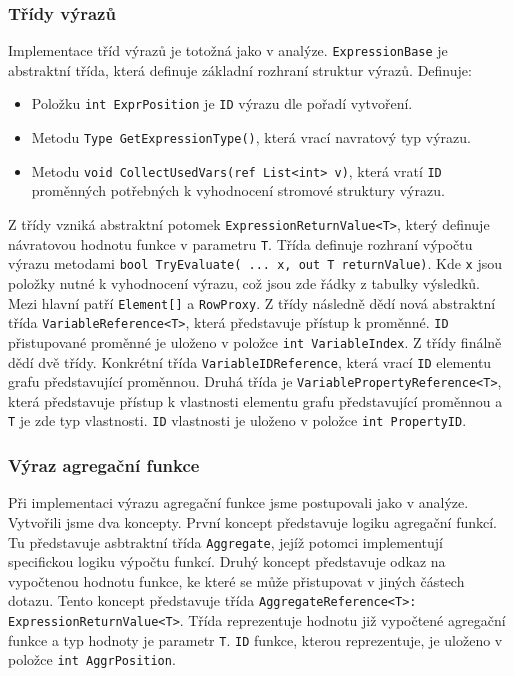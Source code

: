 \subsubsection{Třídy výrazů}

Implementace tříd výrazů je totožná jako v analýze.
\texttt{ExpressionBase} je abstraktní třída, která definuje základní rozhraní struktur výrazů.
Definuje:
\begin{itemize}
\item Položku \texttt{int ExprPosition} je \texttt{ID} výrazu dle pořadí vytvoření.
\item Metodu \texttt{Type GetExpressionType()}, která vrací navratový typ výrazu.
\item Metodu \texttt{void CollectUsedVars(ref List<int> v)}, která vratí \texttt{ID} proměnných potřebných k vyhodnocení stromové struktury výrazu.
\end{itemize}
Z třídy vzniká abstraktní potomek \texttt{ExpressionReturnValue<T>}, který definuje návratovou hodnotu funkce v parametru \texttt{T}.
Třída definuje rozhraní výpočtu výrazu metodami \texttt{bool TryEvaluate( ... x, out T returnValue)}.
Kde \texttt{x} jsou položky nutné k vyhodnocení výrazu, což jsou zde řádky z tabulky výsledků.
Mezi hlavní patří \texttt{Element[]} a \texttt{RowProxy}.
Z třídy následně dědí nová abstraktní třída \texttt{VariableReference<T>}, která představuje přístup k proměnné.
\texttt{ID} přistupované proměnné je uloženo v položce \texttt{int VariableIndex}.
Z třídy finálně dědí dvě třídy.
Konkrétní třída \texttt{VariableIDReference}, která vrací \texttt{ID} elementu grafu představující proměnnou.
Druhá třída je \texttt{VariablePropertyReference<T>}, která představuje přístup k vlastnosti elementu grafu představující proměnnou a \texttt{T} je zde typ vlastnosti.
\texttt{ID} vlastnosti je uloženo v položce \texttt{int PropertyID}. 

\subsubsection{Výraz agregační funkce}

Při implementaci výrazu agregační funkce jsme postupovali jako v analýze.
Vytvořili jsme dva koncepty.
První koncept představuje logiku agregační funkcí.
Tu představuje asbtraktní třída \texttt{Aggregate}, jejíž potomci implementují specifickou logiku výpočtu funkcí. 
Druhý koncept představuje odkaz na vypočtenou hodnotu funkce, ke které se může přistupovat v jiných částech dotazu.
Tento koncept představuje třída \texttt{AggregateReference<T>: ExpressionReturnValue<T>}.
Třída reprezentuje hodnotu již vypočtené agregační funkce a typ hodnoty je parametr \texttt{T}.
\texttt{ID} funkce, kterou reprezentuje, je uloženo v položce \texttt{int AggrPosition}.

